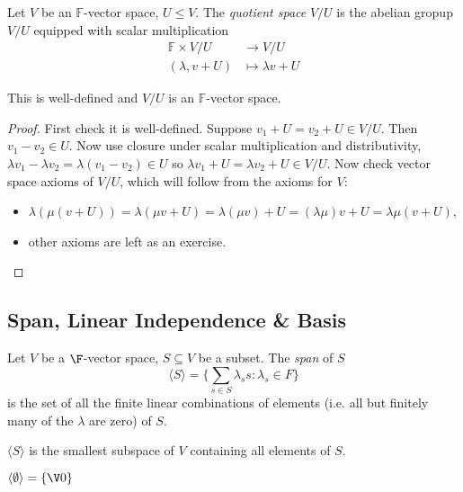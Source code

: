 \documentclass[a4paper]{article}
\theoremstyle{definition}
\begin{document}
\begin{defi}
  Let $V$ be an $\mathbb{F}$-vector space, $U \leq V$. The \emph{quotient space} $V/U$ is the abelian gropup $V/U$ equipped with scalar multiplication
  \begin{align*}
    \mathbb{F} \times V/U &\to V/U \\
    (\lambda, v+U) &\mapsto \lambda v+U
  \end{align*}
\end{defi}

\begin{prop}
  This is well-defined and $V/U$ is an $\mathbb{F}$-vector space.
\end{prop}

\begin{proof}
  First check it is well-defined. Suppose $v_1+U= v_2+U \in V/U$. Then $v_1-v_2\in U$. Now use closure under scalar multiplication and distributivity, $\lambda v_1 - \lambda v_2 = \lambda(v_1-v_2)\in U$ so $\lambda v_1 + U = \lambda v_2 +U\in V/U$.
  Now check vector space axioms of $V/U$, which will follow from the axioms for $V$:
  \begin{itemize}
  \item $\lambda(\mu(v+U)) = \lambda(\mu v+U) = \lambda(\mu v)+U = (\lambda\mu) v+U = \lambda\mu(v+U)$,
  \item other axioms are left as an exercise.
  \end{itemize}
\end{proof}

\subsection{Span, Linear Independence \& Basis}

\begin{defi}
  Let $V$ be a $\F$-vector space, $S \subseteq V$ be a subset. The \emph{span} of $S$
  \[
    \langle S \rangle = \Big\{\sum_{s\in S} \lambda_s s : \lambda_s \in F \Big\}
  \]
  is the set of all the finite linear combinations of elements (i.e. all but finitely many of the $\lambda$ are zero) of $S$.
\end{defi}

\begin{rmk}
  $\langle S \rangle$ is the smallest subspace of $V$ containing all elements of $S$.
\end{rmk}

\begin{convention}
  $\langle \emptyset \rangle = \{\V 0\}$
\end{convention}
\end{document}
